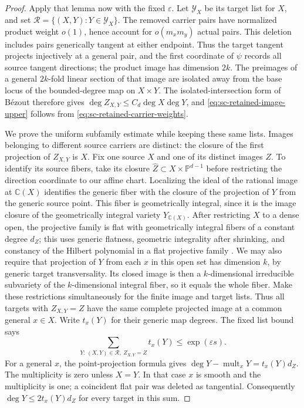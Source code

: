 \begin{proof}
Apply that lemma now with the fixed $\varepsilon$.  Let $\mathcal{Y}_X$ be its target list for $X$, and set $\mathcal{R}=\{(X,Y):Y\in\mathcal{Y}_X\}$.  The removed carrier pairs have normalized product weight $o(1)$, hence account for $o(m_xm_y)$ actual pairs.  This deletion includes pairs generically tangent at either endpoint.  Thus the target tangent projects injectively at a general pair, and the first coordinate of $\psi$ records all source tangent directions; the product image has dimension $2k$.  The preimages of a general $2k$-fold linear section of that image are isolated away from the base locus of the bounded-degree map on $X\times Y$.  The isolated-intersection form of B\'ezout therefore gives $\deg Z_{X,Y}\le C_d\deg X\deg Y$, and \eqref{eq:sc-retained-image-upper} follows from \eqref{eq:sc-retained-carrier-weights}.

We prove the uniform subfamily estimate while keeping these same lists. Images belonging to different source carriers are distinct: the closure of the first projection of $Z_{X,Y}$ is $X$.  Fix one source $X$ and one of its distinct images $Z$.  To identify its source fibers, take its closure $\widehat Z\subset X\times\mathbb{P}^{d-1}$ before restricting the direction coordinate to our affine chart.  Localizing the ideal of the rational image at $\mathbb{C}(X)$ identifies the generic fiber with the closure of the projection of $Y$ from the generic source point.  This fiber is geometrically integral, since it is the image closure of the geometrically integral variety $Y_{\mathbb{C}(X)}$.  After restricting $X$ to a dense open, the projective family is flat with geometrically integral fibers of a constant degree $d_Z$; this uses generic flatness, geometric integrality after shrinking, and constancy of the Hilbert polynomial in a flat projective family \cite[Tags~052A, 0559, 0C0E, and 0B9T]{stacksproject}. We may also require that projection of $Y$ from each $x$ in this open set has dimension $k$, by generic target transversality. Its closed image is then a $k$-dimensional irreducible subvariety of the $k$-dimensional integral fiber, so it equals the whole fiber.  Make these restrictions simultaneously for the finite image and target lists. Thus all targets with $Z_{X,Y}=Z$ have the same complete projected image at a common general $x\in X$.  Write $t_x(Y)$ for their generic map degrees. The fixed list bound says
\[
 \sum_{Y:\,(X,Y)\in\mathcal{R},\ Z_{X,Y}=Z}t_x(Y)
 \le \exp(\varepsilon s).
\]
For a general $x$, the point-projection formula gives $\deg Y-\operatorname{mult}_xY=t_x(Y)d_Z$. The multiplicity is zero unless $X=Y$.  In that case $x$ is smooth and the multiplicity is one; a coincident flat pair was deleted as tangential. Consequently $\deg Y\le2t_x(Y)d_Z$ for every target in this sum.


\end{proof}
